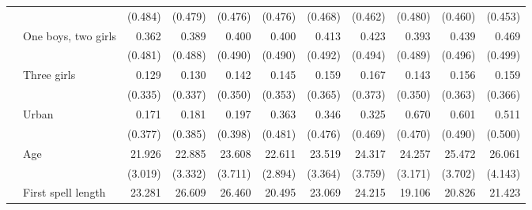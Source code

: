 \documentclass[12pt,letterpaper]{article}
\begin{document}
\begin{table}
\begin{center}
\begin{scriptsize}
\begin{threeparttable}
\begin{tabular} {@{} c l D{.}{.}{1.3} D{.}{.}{1.3} D{.}{.}{1.3} D{.}{.}{1.3} D{.}{.}{1.3} D{.}{.}{1.3} D{.}{.}{1.3} D{.}{.}{1.3} D{.}{.}{1.3} @{}}
                    &                     &     (0.484)         &     (0.479)         &     (0.476)         &     (0.476)         &     (0.468)         &     (0.462)         &     (0.480)         &     (0.460)         &     (0.453)         \\
                    & One boys, two girls &       0.362         &       0.389         &       0.400         &       0.400         &       0.413         &       0.423         &       0.393         &       0.439         &       0.469         \\
                    &                     &     (0.481)         &     (0.488)         &     (0.490)         &     (0.490)         &     (0.492)         &     (0.494)         &     (0.489)         &     (0.496)         &     (0.499)         \\
                    & Three girls         &       0.129         &       0.130         &       0.142         &       0.145         &       0.159         &       0.167         &       0.143         &       0.156         &       0.159         \\
                    &                     &     (0.335)         &     (0.337)         &     (0.350)         &     (0.353)         &     (0.365)         &     (0.373)         &     (0.350)         &     (0.363)         &     (0.366)         \\
                    & Urban               &       0.171         &       0.181         &       0.197         &       0.363         &       0.346         &       0.325         &       0.670         &       0.601         &       0.511         \\
                    &                     &     (0.377)         &     (0.385)         &     (0.398)         &     (0.481)         &     (0.476)         &     (0.469)         &     (0.470)         &     (0.490)         &     (0.500)         \\
                    & Age                 &      21.926         &      22.885         &      23.608         &      22.611         &      23.519         &      24.317         &      24.257         &      25.472         &      26.061         \\
                    &                     &     (3.019)         &     (3.332)         &     (3.711)         &     (2.894)         &     (3.364)         &     (3.759)         &     (3.171)         &     (3.702)         &     (4.143)         \\
                    & First spell length  &      23.281         &      26.609         &      26.460         &      20.495         &      23.069         &      24.215         &      19.106         &      20.826         &      21.423         \\

\end{tabular}
\end{threeparttable}
\end{scriptsize}
\end{center}
\end{table}
\end{document}
